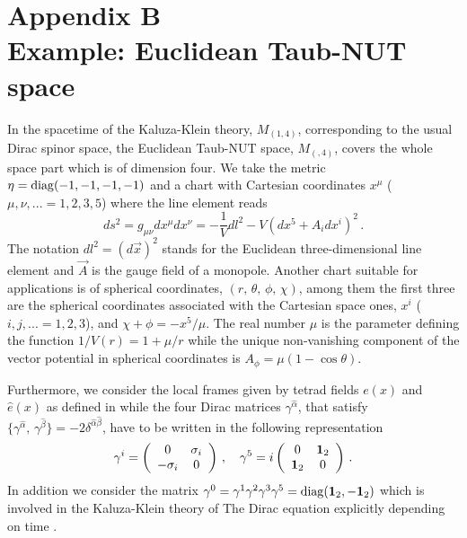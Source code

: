 \documentclass[a4paper,12pt]{article}
\begin{document}
\setcounter{equation}{0} \renewcommand{\theequation}
{B.\arabic{equation}}

\section*{Appendix B\\Example: Euclidean Taub-NUT space}

In the spacetime of the Kaluza-Klein theory, $M_{(1,4)}$, corresponding to the 
usual Dirac spinor space, the Euclidean Taub-NUT space, $M_{(,4)}$, covers the 
whole space part which is of dimension four. We take the metric 
$\eta={\rm diag}(-1,-1,-1,-1)$ and a 
chart with Cartesian coordinates $x^{\mu}$  ($\mu, \nu,...=1,2,3,5$) where the 
line element reads 
\begin{equation}\label{(met)} 
ds^{2}=g_{\mu\nu}dx^{\mu}dx^{\nu}=-\frac{1}{V}dl^{2}-V(dx^{5}+
A_{i}dx^{i})^{2}\,.
\end{equation}   
The notation $dl^{2}=(d\vec{x})^{2}$ stands for the  Euclidean 
three-di\-men\-sio\-nal line element and $\vec{A}$ is the gauge field of a 
monopole. Another chart suitable for applications is 
of spherical coordinates, $(r,\,\theta,\,\phi,\,\chi)$, among them 
the first three are the  spherical coordinates associated with 
the  Cartesian space ones, $x^{i}$  ($i,j,...=1,2,3$), and 
$\chi+\phi=- x^{5}/\mu$. The real number $\mu$ is the  parameter  
defining the function $1/V(r)=1+\mu/r$ while the unique non-vanishing 
component of the vector potential in spherical coordinates is 
$A_{\phi}=\mu(1-\cos\theta)$. 

Furthermore, we consider the local frames given by tetrad fields 
$e(x)$ and $\hat e(x)$ as defined in \cite{P} while the four Dirac matrices 
$\gamma^{\hat\alpha}$, that  satisfy 
$\{ \gamma^{\hat\alpha},\, \gamma^{\hat\beta} \} 
=-2\delta^{\hat\alpha \hat\beta}$, have to be written in the following  
representation 
\begin{equation}\label{(gammai)} 
\gamma^i = 
\left(
\begin{array}{cc}
0&\sigma_i\\
-\sigma_i&0
\end{array}\right)\,,\quad  
\gamma^5 =i
\left(
\begin{array}{cc}
0&{\bf 1}_2\\
{\bf 1}_2&0
\end{array}\right)\,.
\end{equation}
In addition we consider the matrix
$\gamma^0 = \gamma^1\gamma^2\gamma^3\gamma^5 ={\rm diag}({\bf 1}_2,
-{\bf 1}_2)$
which is involved in the Kaluza-Klein theory of The Dirac equation explicitly 
depending on time \cite{CV0}.
\end{document}
